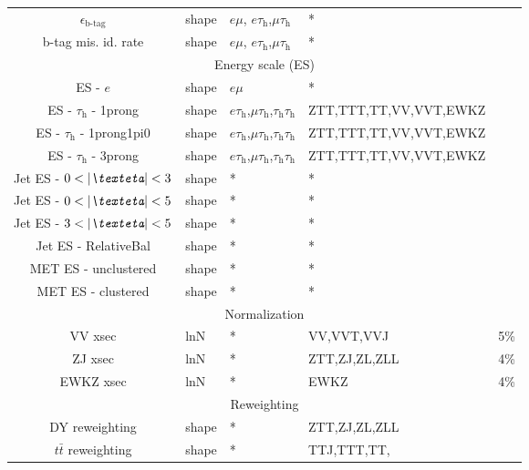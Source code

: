 \begin{table}[!]
\begin{tabular}{cllll}
        $\epsilon_{\text{b-tag}}$               &  shape                &  $e\mu$, $e\tau_\text{h}$,$\mu\tau_\text{h}$   & * &\\
        b-tag mis. id. rate                     &  shape                &  $e\mu$, $e\tau_\text{h}$,$\mu\tau_\text{h}$   & * &\\ \midrule
        \multicolumn{5}{c}{Energy scale (ES)} \\ \midrule
        \tau{} ES - $e$                           & shape                 & $e\mu$                         & * & \\ 
        \tau{} ES - $\tau_\text{h}$ - 1prong      & shape                 & $e\tau_\text{h}$,$\mu\tau_\text{h}$,$\tau_\text{h}\tau_\text{h}$ & ZTT,TTT,TT,VV,VVT,EWKZ & \\  
        \tau{} ES - $\tau_\text{h}$ - 1prong1pi0  & shape                 & $e\tau_\text{h}$,$\mu\tau_\text{h}$,$\tau_\text{h}\tau_\text{h}$ & ZTT,TTT,TT,VV,VVT,EWKZ & \\  
        \tau{} ES - $\tau_\text{h}$ - 3prong      & shape                 & $e\tau_\text{h}$,$\mu\tau_\text{h}$,$\tau_\text{h}\tau_\text{h}$ & ZTT,TTT,TT,VV,VVT,EWKZ & \\  
        Jet ES - $\text{0}<\abs{\eta} < \text{3}$ & shape                 & *                              & * & \\
        Jet ES - $\text{0}<\abs{\eta} < \text{5}$ & shape                 & *                              & * & \\
        Jet ES - $\text{3}<\abs{\eta} < \text{5}$ & shape                 & *                              & * & \\
        Jet ES - RelativeBal                    & shape                 & *                              & * & \\
        MET ES - unclustered                    & shape                 & *                              & * & \\
        MET ES - clustered                      & shape                 & *                              & * & \\ \hline
        \multicolumn{5}{c}{Normalization} \\ \midrule
        VV xsec                           & lnN                   & *                              & VV,VVT,VVJ & 5\% \\
        ZJ xsec                           & lnN                   & *                              & ZTT,ZJ,ZL,ZLL & 4\% \\
        EWKZ xsec                         & lnN                   & *                              & EWKZ & 4\% \\ \midrule
        \multicolumn{5}{c}{Reweighting} \\ \midrule
        DY reweighting                    & shape                   & * & ZTT,ZJ,ZL,ZLL &   \\
        $t\bar{t}$ reweighting            & shape                   & * & TTJ,TTT,TT,                   & \\ \bottomrule
    \end{tabular}
\end{table}

